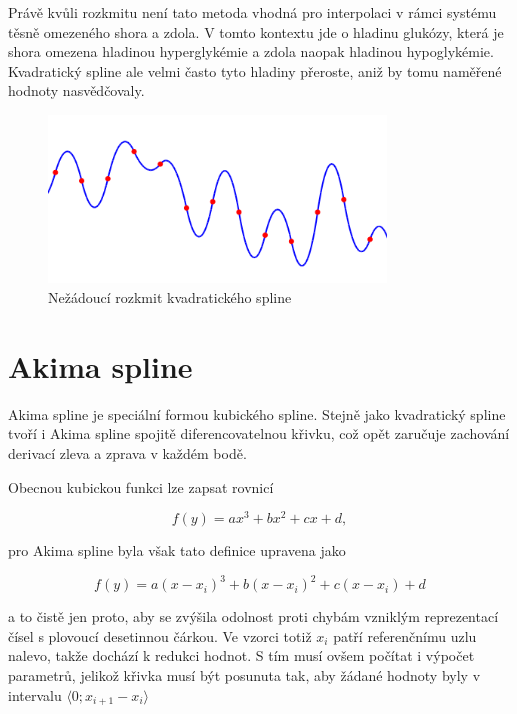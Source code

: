 \documentclass[]{thesiskiv}
\begin{document}
Právě kvůli rozkmitu není tato metoda vhodná pro interpolaci v rámci systému těsně omezeného shora a zdola. V tomto kontextu jde o hladinu glukózy, která je shora omezena hladinou hyperglykémie a zdola naopak hladinou hypoglykémie. Kvadratický spline ale velmi často tyto hladiny přeroste, aniž by tomu naměřené hodnoty nasvědčovaly.

\begin{figure}[ht]
	\centering
	\includegraphics[width=0.8\textwidth]{img/rozkmit.png}
	\caption{Nežádoucí rozkmit kvadratického spline}\label{img:rozkmit}
\end{figure}

\section{Akima spline}

Akima spline je speciální formou kubického spline. Stejně jako kvadratický spline tvoří i Akima spline spojitě diferencovatelnou křivku, což opět zaručuje zachování derivací zleva a zprava v každém bodě\cite{akima}.

Obecnou kubickou funkci lze zapsat rovnicí

\begin{equation}\label{eq:cubic}
f(y)=ax^3+bx^2+cx+d,
\end{equation}

pro Akima spline byla však tato definice upravena jako

\begin{equation}
f(y)=a(x-x_i)^3+b(x-x_i)^2+c(x-x_i)+d
\end{equation}

a to čistě jen proto, aby se zvýšila odolnost proti chybám vzniklým reprezentací čísel s plovoucí desetinnou čárkou. Ve vzorci totiž $x_i$ patří referenčnímu uzlu nalevo, takže dochází k redukci hodnot. S tím musí ovšem počítat i výpočet parametrů, jelikož křivka musí být posunuta tak, aby žádané hodnoty byly v intervalu $\langle0 ; x_{i+1} - x_i \rangle$
\end{document}
